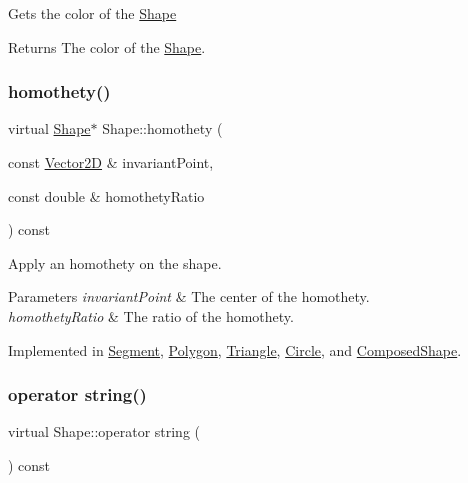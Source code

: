 Gets the color of the \hyperlink{class_shape}{Shape} \begin{DoxyReturn}{Returns}
The color of the \hyperlink{class_shape}{Shape}. 
\end{DoxyReturn}
\hypertarget{class_shape_a91f18af3004ba210db5c91084c50beb9}{}\label{class_shape_a91f18af3004ba210db5c91084c50beb9} 
\subsubsection{\texorpdfstring{homothety()}{homothety()}}
{\footnotesize\ttfamily virtual \hyperlink{class_shape}{Shape}$\ast$ Shape\+::homothety (\begin{DoxyParamCaption}\item[{const \hyperlink{class_vector2_d}{Vector2D} \&}]{invariant\+Point,  }\item[{const double \&}]{homothety\+Ratio }\end{DoxyParamCaption}) const\hspace{0.3cm}{\ttfamily [pure virtual]}}

Apply an homothety on the shape. 
\begin{DoxyParams}{Parameters}
{\em invariant\+Point} & The center of the homothety. \\
\hline
{\em homothety\+Ratio} & The ratio of the homothety. \\
\hline
\end{DoxyParams}


Implemented in \hyperlink{class_segment_a5fe8d9711a0d3405a8c4cf3270069ee3}{Segment}, \hyperlink{class_polygon_a2b77c7ecbe9ca68664d7f7020181b791}{Polygon}, \hyperlink{class_triangle_a45a3a9f74118c99b95c6d8e993773a71}{Triangle}, \hyperlink{class_circle_a031f188681977c2cf6ba2e80e30fb5ce}{Circle}, and \hyperlink{class_composed_shape_acff645310f05924aaf66b0de71b2307a}{Composed\+Shape}.

\hypertarget{class_shape_a0d74dcb2db0791b88b92f439bf4a6972}{}\label{class_shape_a0d74dcb2db0791b88b92f439bf4a6972} 
\subsubsection{\texorpdfstring{operator string()}{operator string()}}
{\footnotesize\ttfamily virtual Shape\+::operator string (\begin{DoxyParamCaption}{ }\end{DoxyParamCaption}) const\hspace{0.3cm}{\ttfamily [pure virtual]}}

